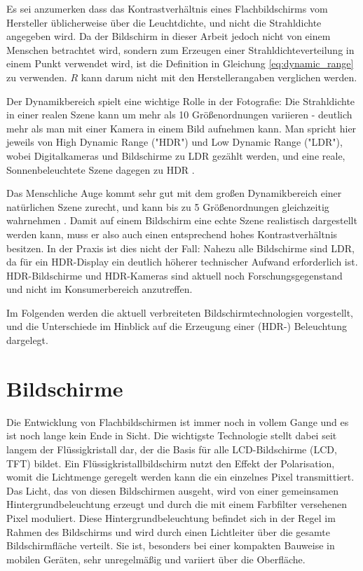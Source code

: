     Es sei anzumerken dass das Kontrastverhältnis eines Flachbildschirms vom Hersteller üblicherweise über die Leuchtdichte, und nicht die Strahldichte angegeben wird. 
    Da der Bildschirm in dieser Arbeit jedoch nicht von einem Menschen betrachtet wird, sondern zum Erzeugen einer Strahldichteverteilung in einem Punkt verwendet wird, ist die Definition in Gleichung \ref{eq:dynamic_range} zu verwenden.
    $R$ kann darum nicht mit den Herstellerangaben verglichen werden.


    Der Dynamikbereich spielt eine wichtige Rolle in der Fotografie: Die Strahldichte in einer realen Szene kann um mehr als 10 Größenordnungen variieren \cite{Reinhard_2005} - deutlich mehr als man mit einer Kamera in einem Bild aufnehmen kann.
    Man spricht hier jeweils von High Dynamic Range ("HDR") und Low Dynamic Range ("LDR"), wobei Digitalkameras und Bildschirme zu LDR gezählt werden, und eine reale, Sonnenbeleuchtete Szene dagegen zu HDR  \cite{Reinhard_2005}.

 
    Das Menschliche Auge kommt sehr gut mit dem großen Dynamikbereich einer natürlichen Szene zurecht, und kann bis zu 5 Größenordnungen gleichzeitig wahrnehmen \cite{Reinhard_2005}.
    Damit auf einem Bildschirm eine echte Szene realistisch dargestellt werden kann, muss er also auch einen entsprechend hohes Kontrastverhältnis besitzen.
    In der Praxis ist dies nicht der Fall: Nahezu alle Bildschirme sind LDR, da für ein HDR-Display ein deutlich höherer technischer Aufwand erforderlich ist. 
    HDR-Bildschirme und HDR-Kameras sind aktuell noch Forschungsgegenstand und nicht im Konsumerbereich anzutreffen.

    Im Folgenden werden die aktuell verbreiteten Bildschirmtechnologien vorgestellt, und die Unterschiede im Hinblick auf die Erzeugung einer (HDR-) Beleuchtung dargelegt.
     
 
 \section{Bildschirme} \label{bildschirme}
    
    Die Entwicklung von Flachbildschirmen ist immer noch in vollem Gange und es ist noch lange kein Ende in Sicht.
    Die wichtigste Technologie stellt dabei seit langem der Flüssigkristall dar, der die Basis für alle LCD-Bildschirme (LCD, TFT) bildet.
    Ein Flüssigkristallbildschirm nutzt den Effekt der Polarisation, womit die Lichtmenge geregelt werden kann die ein einzelnes Pixel transmittiert.
    Das Licht, das von diesen Bildschirmen ausgeht, wird von einer gemeinsamen Hintergrundbeleuchtung erzeugt und durch die mit einem Farbfilter versehenen Pixel moduliert.
    Diese Hintergrundbeleuchtung befindet sich in der Regel im Rahmen des Bildschirms und wird durch einen Lichtleiter über die gesamte Bildschirmfläche verteilt. 
    Sie ist, besonders bei einer kompakten Bauweise in mobilen Geräten, sehr unregelmäßig und variiert über die Oberfläche.

